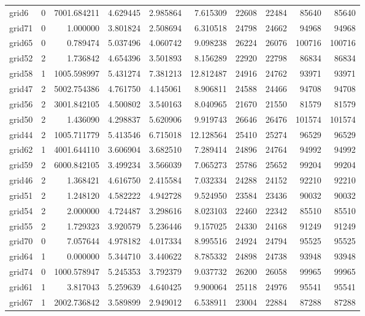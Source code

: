 \begin{longtable}{|l|r|r|r|r|r|r|r|r|r|}
grid6 & 0 & 7001.684211 & 4.629445 & 2.985864 & 7.615309 & 22608 & 22484 & 85640 & 85640 \\
grid71 & 0 & 1.000000 & 3.801824 & 2.508694 & 6.310518 & 24798 & 24662 & 94968 & 94968 \\
grid65 & 0 & 0.789474 & 5.037496 & 4.060742 & 9.098238 & 26224 & 26076 & 100716 & 100716 \\
grid52 & 2 & 1.736842 & 4.654396 & 3.501893 & 8.156289 & 22920 & 22798 & 86834 & 86834 \\
grid58 & 1 & 1005.598997 & 5.431274 & 7.381213 & 12.812487 & 24916 & 24762 & 93971 & 93971 \\
grid47 & 2 & 5002.754386 & 4.761750 & 4.145061 & 8.906811 & 24588 & 24466 & 94708 & 94708 \\
grid56 & 2 & 3001.842105 & 4.500802 & 3.540163 & 8.040965 & 21670 & 21550 & 81579 & 81579 \\
grid50 & 2 & 1.436090 & 4.298837 & 5.620906 & 9.919743 & 26646 & 26476 & 101574 & 101574 \\
grid44 & 2 & 1005.711779 & 5.413546 & 6.715018 & 12.128564 & 25410 & 25274 & 96529 & 96529 \\
grid62 & 1 & 4001.644110 & 3.606904 & 3.682510 & 7.289414 & 24896 & 24764 & 94992 & 94992 \\
grid59 & 2 & 6000.842105 & 3.499234 & 3.566039 & 7.065273 & 25786 & 25652 & 99204 & 99204 \\
grid46 & 2 & 1.368421 & 4.616750 & 2.415584 & 7.032334 & 24288 & 24152 & 92210 & 92210 \\
grid51 & 2 & 1.248120 & 4.582222 & 4.942728 & 9.524950 & 23584 & 23436 & 90032 & 90032 \\
grid54 & 2 & 2.000000 & 4.724487 & 3.298616 & 8.023103 & 22460 & 22342 & 85510 & 85510 \\
grid55 & 2 & 1.729323 & 3.920579 & 5.236446 & 9.157025 & 24330 & 24168 & 91249 & 91249 \\
grid70 & 0 & 7.057644 & 4.978182 & 4.017334 & 8.995516 & 24924 & 24794 & 95525 & 95525 \\
grid64 & 1 & 0.000000 & 5.344710 & 3.440622 & 8.785332 & 24898 & 24738 & 93948 & 93948 \\
grid74 & 0 & 1000.578947 & 5.245353 & 3.792379 & 9.037732 & 26200 & 26058 & 99965 & 99965 \\
grid61 & 1 & 3.817043 & 5.259639 & 4.640425 & 9.900064 & 25118 & 24976 & 95541 & 95541 \\
grid67 & 1 & 2002.736842 & 3.589899 & 2.949012 & 6.538911 & 23004 & 22884 & 87288 & 87288 \\

\end{longtable}
